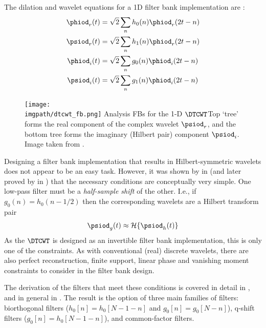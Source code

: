   The dilation and wavelet equations for a 1D filter bank implementation are
  \cite{selesnick_dual-tree_2005}:
  \begin{align}
    \phiod_r(t) & =  \sqrt{2} \sum_n h_0(n) \phiod_r(2t-n) \\
    \psiod_r(t) & =  \sqrt{2} \sum_n h_1(n) \phiod_r(2t-n) \\
    \phiod_i(t) & =  \sqrt{2} \sum_n g_0(n) \phiod_i(2t-n) \\
    \psiod_i(t) & =  \sqrt{2} \sum_n g_1(n) \phiod_i(2t-n)
  \end{align}

  \begin{figure}
    \centering
      \texttt{[image: \\imgpath/dtcwt\_fb.png]}
      \mycaption
      {Analysis FBs for the 1-D $\DTCWT$}{Top `tree' forms the real component of the
      complex wavelet $\psiod_r$, and the bottom tree forms the imaginary (Hilbert
      pair) component $\psiod_i$. Image taken from
      \cite{kingsbury_image_1999}.}
      \label{fig:ch2:dtcwt_1d_fb}
  \end{figure}

  Designing a filter bank implementation that results in Hilbert-symmetric
  wavelets does not appear to be an easy task. However, it was shown
  by \citeauthor{kingsbury_image_1999} in \cite{kingsbury_image_1999} (and later proved by
  \citeauthor{selesnick_hilbert_2001} in \cite{selesnick_hilbert_2001}) that the
  necessary conditions are conceptually very simple. One low-pass filter must be
  a \emph{half-sample shift} of the other. I.e., if $g_0(n) = h_0(n-1/2)$ then
  the corresponding wavelets are a Hilbert transform pair
  \begin{equation}
    \psiod_g(t) \approx \mathcal{H}\{\psiod_h(t)\}
  \end{equation}
  As the $\DTCWT$ is designed as an invertible filter bank implementation, this
  is only one of the constraints. As with conventional (real) discrete wavelets,
  there are also perfect reconstruction, finite support, linear phase and
  vanishing moment constraints to consider in the filter bank design.

  The derivation of the filters that meet these conditions is covered in
  detail in \cite{kingsbury_complex_2001, kingsbury_design_2003}, and in
  general in \cite{selesnick_dual-tree_2005}. The result is the
  option of three main families of filters: biorthogonal filters ($h_0[n] =
  h_0[N-1-n]$ and $g_0[n] = g_0[N-n]$), q-shift filters ($g_0[n]
  = h_0[N-1-n]$), and common-factor filters.

